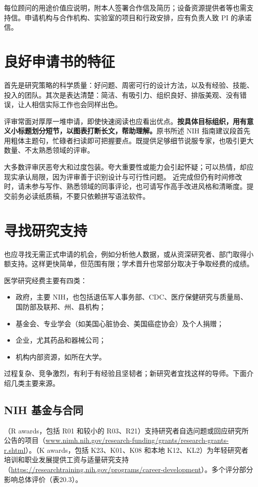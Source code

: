 每位顾问的用途价值应说明，附本人签署合作信及简历；设备资源提供者等也需支持信。申请机构与合作机构、实验室的项目和行政安排，应有负责人致 PI 的承诺信。
\section{良好申请书的特征}
首先是研究策略的科学质量：好问题、周密可行的设计方法，以及有经验、技能、投入的团队。其次是表达清楚：简洁、有吸引力、组织良好、排版美观、没有错误，让人相信实际工作也会同样出色。

评审常面对厚厚一堆申请，即使快速阅读也应看出优点。\textbf{按具体目标组织，用有意义小标题划分短节，以图表打断长文，帮助理解。}原书所述 NIH 指南建议段首先用粗体主题句，忙碌者扫读即可把握要点。既提供足够细节说服专家，也吸引更大数量、不太熟悉领域的评审。

大多数评审厌恶夸大和过度包装。夸大重要性或能力会引起怀疑；可以热情，却应现实承认局限，因为评审善于识别设计与可行性问题。
近完成但仍有时间修改时，请未参与写作、熟悉领域的同事评论，也可请写作高手改进风格和清晰度。提交前务必读纸质稿，不要只依赖拼写语法软件。

\section{寻找研究支持}
也应寻找无需正式申请的机会，例如分析他人数据，或从资深研究者、部门取得小额支持。这样更快简单，但范围有限；学术晋升也常部分取决于争取经费的成绩。

医学研究经费主要有四类：
\begin{itemize}
\item 政府，主要 NIH，也包括退伍军人事务部、CDC、医疗保健研究与质量局、国防部及联邦、州、县机构；
\item 基金会、专业学会（如美国心脏协会、美国癌症协会）及个人捐赠；
\item 企业，尤其药品和器械公司；
\item 机构内部资源，如所在大学。
\end{itemize}
过程复杂、竞争激烈，有利于有经验且坚韧者；新研究者宜找这样的导师。下面介绍几类主要来源。

\subsection{NIH 基金与合同}
（R awards，包括 R01 和较小的 R03、R21）支持研究者自选问题或回应研究所公告的项目（\url{www.nimh.nih.gov/research-funding/grants/research-grants-r.shtml}）。（K awards，包括 K23、K01、K08 和本地 K12、KL2）为年轻研究者培训和职业发展提供工资与适量研究支持（\url{https://researchtraining.nih.gov/programs/career-development}）。多个评分部分影响总体评价（表20.3）。

